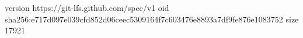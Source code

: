 version https://git-lfs.github.com/spec/v1
oid sha256:e717d097e039cfd852d06ceec5309164f7c603476e8893a7df9fe876e1083752
size 17921
